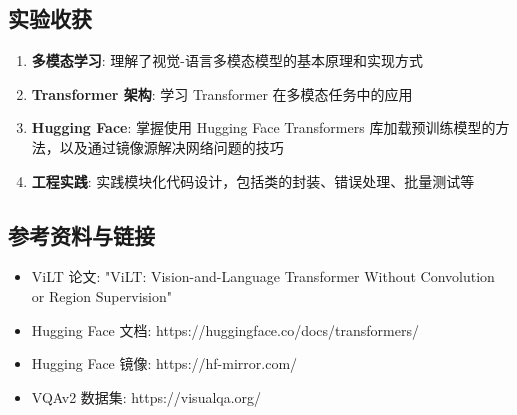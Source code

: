 \documentclass[a4paper]{article}
\begin{document}
\subsection{实验收获}

\begin{enumerate}
    \item \textbf{多模态学习}: 理解了视觉-语言多模态模型的基本原理和实现方式
    \item \textbf{Transformer 架构}: 学习 Transformer 在多模态任务中的应用
    \item \textbf{Hugging Face}: 掌握使用 Hugging Face Transformers 库加载预训练模型的方法，以及通过镜像源解决网络问题的技巧
    \item \textbf{工程实践}: 实践模块化代码设计，包括类的封装、错误处理、批量测试等
\end{enumerate}

\subsection{参考资料与链接}
\begin{itemize}
    \item ViLT 论文: "ViLT: Vision-and-Language Transformer Without Convolution or Region Supervision"
    \item Hugging Face 文档: https://huggingface.co/docs/transformers/
    \item Hugging Face 镜像: https://hf-mirror.com/
    \item VQAv2 数据集: https://visualqa.org/
\end{itemize}
\end{document}
